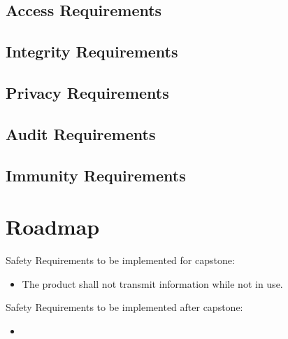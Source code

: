 \documentclass{article}
\begin{document}
\subsection{Access Requirements}

\subsection{Integrity Requirements}

\subsection{Privacy Requirements}

\subsection{Audit Requirements}

\subsection{Immunity Requirements}

\section{Roadmap}


Safety Requirements to be implemented for capstone:
\begin{itemize}
    \item The product shall not transmit information while not in use.
\end{itemize}

Safety Requirements to be implemented after capstone:
\begin{itemize}
    \item
\end{itemize}
\end{document}
